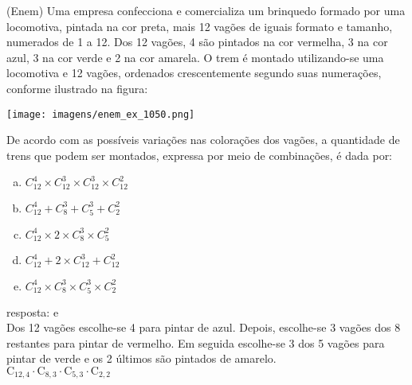 \begin{ex}
  (Enem) Uma empresa confecciona e comercializa um brinquedo formado por uma locomotiva, pintada na cor preta, mais 12 vagões de iguais formato e tamanho, numerados de 1 a 12. Dos 12 vagões, 4 são pintados na cor vermelha, 3 na cor azul, 3 na cor verde e 2 na cor amarela. O trem é montado utilizando-se uma locomotiva e 12 vagões, ordenados crescentemente segundo suas numerações, conforme ilustrado na figura:
    \begin{center}
        \texttt{[image: imagens/enem\_ex\_1050.png]}
    \end{center}
  De acordo com as possíveis variações nas colorações dos vagões, a quantidade de trens que podem ser montados, expressa por meio de combinações, é dada por:
    \begin{enumerate}   [(a)]
        \item $C_{12}^4\times C_{12}^3\times C_{12}^3\times C_{12}^2$
        \item  $C_{12}^4+C_8^3+C_5^3+C_2^2$
        \item $C_{12}^4\times2\times C_8^3\times C_5^2$
        \item $C_{12}^4+2\times C_{12}^3+ C_{12}^2$
        \item $C_{12}^4\times C_8^3\times C_5^3\times C_2^2$
    \end{enumerate}
      \begin{sol}
      resposta: e \\
      Dos 12 vagões escolhe-se 4 para pintar de azul. Depois, escolhe-se 3 vagões dos 8 restantes para pintar de vermelho. Em seguida escolhe-se 3 dos 5 vagões para pintar de verde e os 2 últimos são pintados de amarelo. \\
      $\mathrm{C}_{{12},4}\cdot\mathrm{C}_{8,3}\cdot\mathrm{C}_{5,3}\cdot\mathrm{C}_{2,2}$
      \end{sol}
  \end{ex}